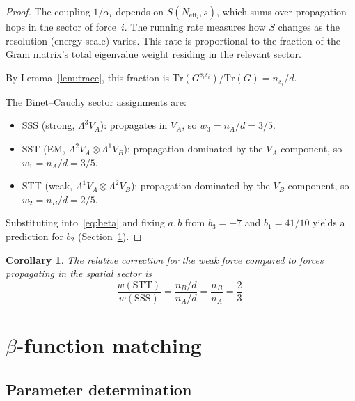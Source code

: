 \documentclass[12pt]{article}
\newtheorem{corollary}[theorem]{Corollary}
\theoremstyle{definition}
\theoremstyle{remark}
\newcommand{\Neff}{N_{\mathrm{eff}}}
\newcommand{\Tr}{\mathrm{Tr}}
\begin{document}
\begin{proof}
The coupling $1/\alpha_i$ depends on
$S(\Neff_i, s)$, which sums over propagation hops
in the sector of force~$i$.
The running rate measures how $S$ changes
as the resolution (energy scale) varies.
This rate is proportional to the fraction of
the Gram matrix's total eigenvalue weight
residing in the relevant sector.

By Lemma~\ref{lem:trace}, this fraction is
$\Tr(G^{s_i s_i})/\Tr(G) = n_{s_i}/d$.

The Binet--Cauchy sector assignments are:
\begin{itemize}
\item SSS (strong, $\Lambda^3 V_A$):
  propagates in $V_A$, so $w_3 = n_A/d = 3/5$.
\item SST (EM, $\Lambda^2 V_A \otimes \Lambda^1 V_B$):
  propagation dominated by the $V_A$ component,
  so $w_1 = n_A/d = 3/5$.
\item STT (weak, $\Lambda^1 V_A \otimes \Lambda^2 V_B$):
  propagation dominated by the $V_B$ component,
  so $w_2 = n_B/d = 2/5$.
\end{itemize}

Substituting into~\eqref{eq:beta}
and fixing $a, b$ from $b_3 = -7$ and $b_1 = 41/10$
yields a prediction for $b_2$
(Section~\ref{sec:matching}).
\end{proof}

\begin{corollary}
The relative correction for the weak force compared
to forces propagating in the spatial sector is
\begin{equation}
  \frac{w(\mathrm{STT})}{w(\mathrm{SSS})}
  = \frac{n_B/d}{n_A/d}
  = \frac{n_B}{n_A}
  = \frac{2}{3}.
  \label{eq:correction}
\end{equation}
\end{corollary}

\section{$\beta$-function matching}
\label{sec:matching}

\subsection{Parameter determination}
\end{document}
